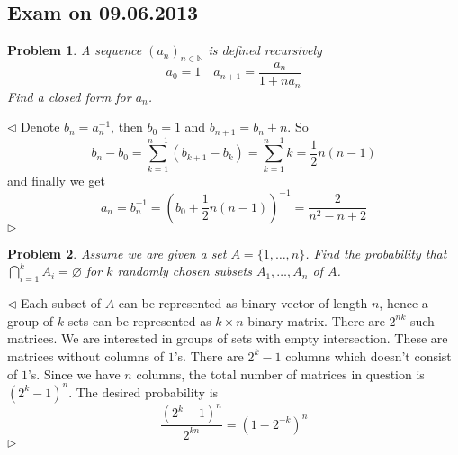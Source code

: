 \documentclass[12pt]{article}
\newtheorem{problem}{Problem}[subsection]
\newenvironment{solution}{\par $\triangleleft$}{$\triangleright$}
\begin{document}
 
 
 
 
 
 
 
 
 
 
 
 
 
 
 
\newpage
 
\subsection{Exam on 09.06.2013}
 
\begin{problem} A sequence $(a_n)_{n\in\mathbb{N}}$ is defined recursively 
$$
a_0=1\quad a_{n+1}=\frac{a_n}{1+n a_n}
$$
Find a closed form for $a_n$.
\end{problem}
\begin{solution} Denote $b_n=a_n^{-1}$, then $b_0=1$ and $b_{n+1}=b_n+n$. So
$$
b_n-b_0=\sum_{k=1}^{n-1}(b_{k+1}-b_k)=\sum_{k=1}^{n-1}k=\frac{1}{2}n(n-1)
$$
and finally we get 
$$
a_n=b_n^{-1}=\left(b_0+\frac{1}{2}n(n-1)\right)^{-1}=\frac{2}{n^2-n+2}
$$
\end{solution}
 
\begin{problem} Assume we are given a set $A=\{1,\ldots,n\}$. Find the probability that $\bigcap_{i=1}^kA_i=\varnothing$ for $k$ randomly chosen subsets $A_1,\ldots,A_n$ of $A$.
\end{problem}
\begin{solution} Each subset of $A$ can be represented as binary vector of length $n$, hence a group of $k$ sets can be represented as $k\times n$ binary matrix. There are $2^{nk}$ such matrices. We are interested in groups of sets with empty intersection. These are matrices without columns of $1$'s. There are $2^k-1$ columns which doesn't consist of $1$'s. Since we have $n$ columns, the total number of matrices in question is $(2^k-1)^n$. The desired probability is
$$
\frac{(2^k-1)^n}{2^{kn}}=(1-2^{-k})^n
$$
\end{solution}
 
\end{document}

